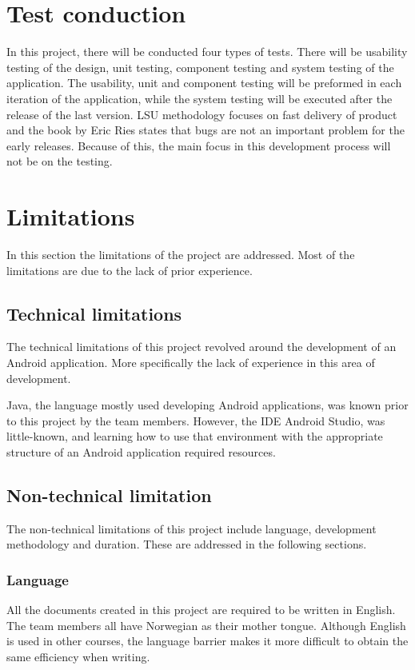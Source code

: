 \section{Test conduction}
In this project, there will be conducted four types of tests. There will be usability testing of the design, unit testing, component testing and system testing of the application. The usability, unit and component testing will be preformed in each iteration of the application, while the system testing will be executed after the release of the last version. \gls{LSU} methodology focuses on fast delivery of product and the book by Eric Ries states that bugs are not an important problem for the early releases. Because of this, the main focus in this development process will not be on the testing.\cite{lean-startup}

\section{Limitations}
In this section the limitations of the project are addressed. Most of the limitations are due to the lack of prior experience.

\subsection{Technical limitations}
The technical limitations of this project revolved around the development of an Android application. More specifically the lack of experience in this area of development.

Java, the language mostly used developing Android applications, was known prior to this project by the team members. However, the \gls{IDE} Android Studio, was little-known, and learning how to use that environment with the appropriate structure of an Android application required resources. 

\subsection{Non-technical limitation}
The non-technical limitations of this project include language, development methodology and duration. These are addressed in the following sections.

\subsubsection{Language}
All the documents created in this project are required to be written in English. The team members all have Norwegian as their mother tongue. Although English is used in other courses, the language barrier makes it more difficult to obtain the same efficiency when writing. 

